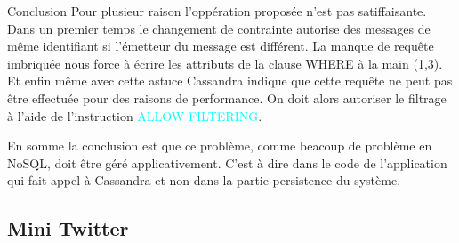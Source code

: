 \begin{block}{Conclusion}
Pour plusieur raison l'oppération proposée n'est pas satiffaisante.
Dans un premier temps le changement de contrainte autorise des messages de même identifiant si 
l'émetteur du message est différent. La manque de requête imbriquée nous force à écrire 
les attributs de la clause WHERE à la main (1,3). Et enfin même avec cette astuce Cassandra indique que 
cette requête ne peut pas être effectuée pour des raisons de performance. On doit alors autoriser 
le filtrage à l'aide de l'instruction \textcolor{cyan}{ALLOW FILTERING}. \newline

En somme la conclusion est que ce problème, comme beacoup de problème en NoSQL,
doit être géré applicativement. C'est à dire dans le code de l'application qui fait appel à Cassandra 
et non dans la partie persistence du système.

\end{block}

\subsection{Mini Twitter}